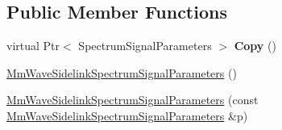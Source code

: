 \subsection*{Public Member Functions}
\begin{DoxyCompactItemize}
\item 
\mbox{\label{structns3_1_1millicar_1_1MmWaveSidelinkSpectrumSignalParameters_a16cf1f44f97b253aef602fe650dbe69e}} 
virtual Ptr$<$ Spectrum\+Signal\+Parameters $>$ {\bfseries Copy} ()
\item 
\hyperlink{structns3_1_1millicar_1_1MmWaveSidelinkSpectrumSignalParameters_ae23417b732d56ba404ddf098f21d264a}{Mm\+Wave\+Sidelink\+Spectrum\+Signal\+Parameters} ()
\item 
\hyperlink{structns3_1_1millicar_1_1MmWaveSidelinkSpectrumSignalParameters_ab40dd2c47c3058b56c99d671a4fd04cf}{Mm\+Wave\+Sidelink\+Spectrum\+Signal\+Parameters} (const \hyperlink{structns3_1_1millicar_1_1MmWaveSidelinkSpectrumSignalParameters}{Mm\+Wave\+Sidelink\+Spectrum\+Signal\+Parameters} \&p)
\end{DoxyCompactItemize}

